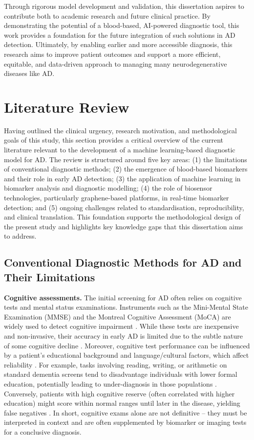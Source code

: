 \documentclass[a4paper,12pt]{article}
\begin{document}
Through rigorous model development and validation, this dissertation aspires to contribute both to academic research and future clinical practice. By demonstrating the potential of a blood-based, AI-powered diagnostic tool, this work provides a foundation for the future integration of such solutions in AD detection. Ultimately, by enabling earlier and more accessible diagnosis, this research aims to improve patient outcomes and support a more efficient, equitable, and data-driven approach to managing many neurodegenerative diseases like AD.

\newpage
\section{Literature Review}


Having outlined the clinical urgency, research motivation, and methodological goals of this study, this section provides a critical overview of the current literature relevant to the development of a machine learning-based diagnostic model for AD. The review is structured around five key areas: (1) the limitations of conventional diagnostic methods; (2) the emergence of blood-based biomarkers and their role in early AD detection; (3) the application of machine learning in biomarker analysis and diagnostic modelling; (4) the role of biosensor technologies, particularly graphene-based platforms, in real-time biomarker detection; and (5) ongoing challenges related to standardisation, reproducibility, and clinical translation. This foundation supports the methodological design of the present study and highlights key knowledge gaps that this dissertation aims to address.



\subsection{Conventional Diagnostic Methods for AD and Their Limitations}
\textbf{Cognitive assessments.} The initial screening for AD often relies on cognitive tests and mental status examinations. Instruments such as the Mini-Mental State Examination (MMSE) and the Montreal Cognitive Assessment (MoCA) are widely used to detect cognitive impairment \cite{folstein1975mini, nasreddine2005montreal}. While these tests are inexpensive and non-invasive, their accuracy in early AD is limited due to the subtle nature of some cognitive decline \cite{petersen1999mild, albert2013diagnosis}. Moreover, cognitive test performance can be influenced by a patient’s educational background and language/cultural factors, which affect reliability \cite{ramos2025education}. For example, tasks involving reading, writing, or arithmetic on standard dementia screens tend to disadvantage individuals with lower formal education, potentially leading to under-diagnosis in those populations \cite{ramos2025education}. Conversely, patients with high cognitive reserve (often correlated with higher education) might score within normal ranges until later in the disease, yielding false negatives \cite{stern2012cognitive}. In short, cognitive exams alone are not definitive – they must be interpreted in context and are often supplemented by biomarker or imaging tests for a conclusive diagnosis.
\end{document}
